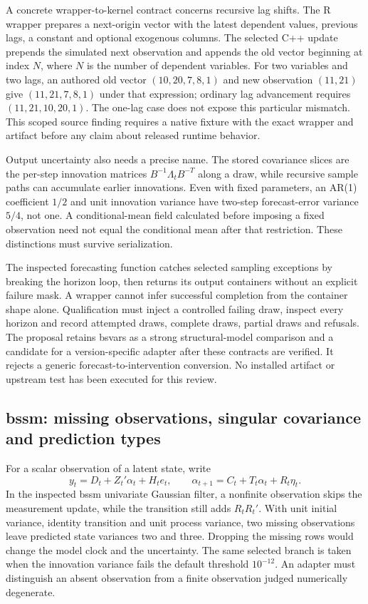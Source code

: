 A concrete wrapper-to-kernel contract concerns recursive lag shifts. The R wrapper prepares a next-origin vector with the latest dependent values, previous lags, a constant and optional exogenous columns. The selected C++ update prepends the simulated next observation and appends the old vector beginning at index $N$, where $N$ is the number of dependent variables. For two variables and two lags, an authored old vector $(10,20,7,8,1)$ and new observation $(11,21)$ give $(11,21,7,8,1)$ under that expression; ordinary lag advancement requires $(11,21,10,20,1)$. The one-lag case does not expose this particular mismatch. This scoped source finding requires a native fixture with the exact wrapper and artifact before any claim about released runtime behavior.~\citep{exec25_cdyn_bsvars,exec25_cdyn_choice}

Output uncertainty also needs a precise name. The stored covariance slices are the per-step innovation matrices $B^{-1}\Lambda_tB^{-T}$ along a draw, while recursive sample paths can accumulate earlier innovations. Even with fixed parameters, an AR(1) coefficient $1/2$ and unit innovation variance have two-step forecast-error variance $5/4$, not one. A conditional-mean field calculated before imposing a fixed observation need not equal the conditional mean after that restriction. These distinctions must survive serialization.~\citep{exec25_cdyn_bsvars,exec25_cdyn_choice}

The inspected forecasting function catches selected sampling exceptions by breaking the horizon loop, then returns its output containers without an explicit failure mask. A wrapper cannot infer successful completion from the container shape alone. Qualification must inject a controlled failing draw, inspect every horizon and record attempted draws, complete draws, partial draws and refusals. The proposal retains bsvars as a strong structural-model comparison and a candidate for a version-specific adapter after these contracts are verified. It rejects a generic forecast-to-intervention conversion. No installed artifact or upstream test has been executed for this review.

\subsection{bssm: missing observations, singular covariance and prediction types}

For a scalar observation of a latent state, write
\[
 y_t=D_t+Z_t'\alpha_t+H_t e_t,\qquad
 \alpha_{t+1}=C_t+T_t\alpha_t+R_t\eta_t.
\]
In the inspected bssm univariate Gaussian filter, a nonfinite observation skips the measurement update, while the transition still adds $R_tR_t'$. With unit initial variance, identity transition and unit process variance, two missing observations leave predicted state variances two and three. Dropping the missing rows would change the model clock and the uncertainty. The same selected branch is taken when the innovation variance fails the default threshold $10^{-12}$. An adapter must distinguish an absent observation from a finite observation judged numerically degenerate.~\citep{exec25_cdyn_bssm,exec25_cdyn_choice}

